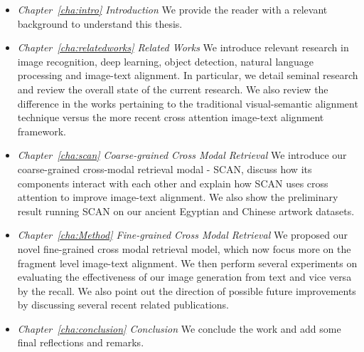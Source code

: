\begin{itemize}
    
    \item \textit{Chapter~\ref{cha:intro} Introduction}\newline
    We provide the reader with a relevant background to understand this thesis.

    \item \textit{Chapter~\ref{cha:relatedworks} Related Works}\newline
    We introduce relevant research in image recognition, deep learning, object detection, natural language processing and image-text alignment. In particular, we detail seminal research and review the overall state of the current research. We also review the difference in the works pertaining to the traditional visual-semantic alignment technique versus the more recent cross attention image-text alignment framework.
    
    \item \textit{Chapter~\ref{cha:scan} Coarse-grained Cross Modal Retrieval}\newline
    We introduce our coarse-grained cross-modal retrieval modal - SCAN, discuss how its components interact with each other and explain how SCAN uses cross attention to improve image-text alignment. We also show the preliminary result running SCAN on our ancient Egyptian and Chinese artwork datasets.
    
    \item \textit{Chapter~\ref{cha:Method} Fine-grained Cross Modal Retrieval}\newline
    We proposed our novel fine-grained cross modal retrieval model, which now focus more on the fragment level image-text alignment. We then perform several experiments on evaluating the effectiveness of our image generation from text and vice versa by the recall. We also point out the direction of
    possible future improvements by discussing several recent related publications.
    
    \item \textit{Chapter~\ref{cha:conclusion} Conclusion}\newline
    We conclude the work and add some final reflections and remarks.
\end{itemize}
